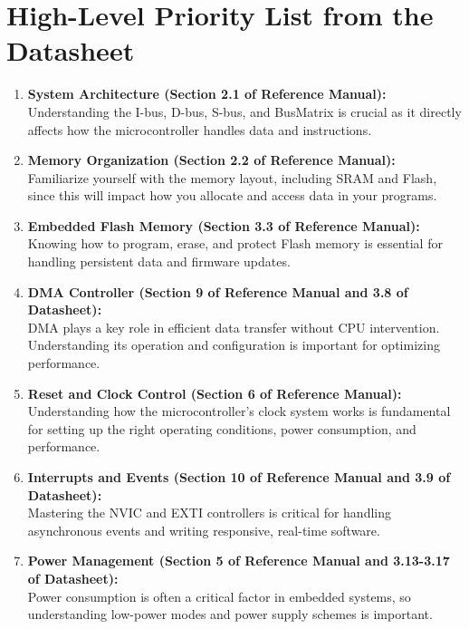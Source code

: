 \documentclass{article}
\begin{document}
\section*{High-Level Priority List from the Datasheet}

\begin{enumerate}[label=\textbf{\arabic*.}]
    \item \textbf{System Architecture (Section 2.1 of Reference Manual):} \\
    Understanding the I-bus, D-bus, S-bus, and BusMatrix is crucial as it directly affects how the microcontroller handles data and instructions.

    \item \textbf{Memory Organization (Section 2.2 of Reference Manual):} \\
    Familiarize yourself with the memory layout, including SRAM and Flash, since this will impact how you allocate and access data in your programs.

    \item \textbf{Embedded Flash Memory (Section 3.3 of Reference Manual):} \\
    Knowing how to program, erase, and protect Flash memory is essential for handling persistent data and firmware updates.

    \item \textbf{DMA Controller (Section 9 of Reference Manual and 3.8 of Datasheet):} \\
    DMA plays a key role in efficient data transfer without CPU intervention. Understanding its operation and configuration is important for optimizing performance.

    \item \textbf{Reset and Clock Control (Section 6 of Reference Manual):} \\
    Understanding how the microcontroller’s clock system works is fundamental for setting up the right operating conditions, power consumption, and performance.

    \item \textbf{Interrupts and Events (Section 10 of Reference Manual and 3.9 of Datasheet):} \\
    Mastering the NVIC and EXTI controllers is critical for handling asynchronous events and writing responsive, real-time software.

    \item \textbf{Power Management (Section 5 of Reference Manual and 3.13-3.17 of Datasheet):} \\
    Power consumption is often a critical factor in embedded systems, so understanding low-power modes and power supply schemes is important.


\end{enumerate}
\end{document}

